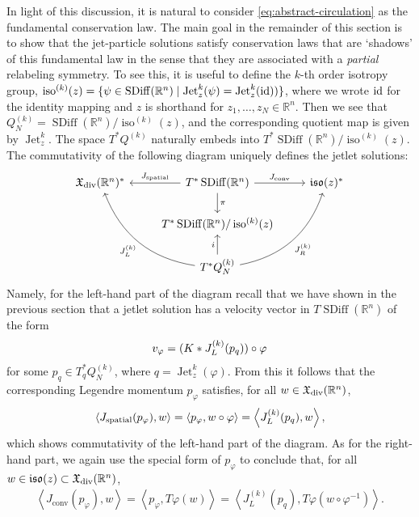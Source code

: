 \documentclass[12pt]{amsart}
\newcommand{\R}{\ensuremath{\mathbb{R}}}
\DeclareMathOperator{\SDiff}{SDiff}
\DeclareMathOperator{\Jet}{Jet}
\DeclareMathOperator{\iso}{iso}
\begin{document}
In light of this discussion, it is natural to consider \eqref{eq:abstract-circulation} as the  fundamental conservation law. The main goal in the remainder of this section is to show that the jet-particle solutions satisfy conservation laws that are `shadows' of this fundamental law in the sense that they are associated with a \emph{partial} relabeling symmetry. To see this, it is useful to define the $k$-th order isotropy group,
$\iso^{(k)}(z) = \{ \psi \in \SDiff(\R^n) \mid \Jet^{k}_z( \psi) = \Jet^k_z (\rm{id})) \}$, where we wrote $\rm{id}$ for the identity mapping and $z$ is shorthand for $z_1, \ldots, z_N \in \mathbb{R}^n$.
Then we see that $Q^{(k)}_N = \SDiff(\R^n) / \iso^{(k)}(z)$, and the corresponding quotient map is given by $\Jet_z^k$.  
 The space $T^*Q^{(k)}$ naturally embeds into $T^*\SDiff(\R^n) / \iso^{(k)}(z)$.  The commutativity of the following diagram uniquely defines the jetlet solutions:
  \begin{equation}
 \begin{tikzcd}
   \mathfrak{X}_{\rm div}(\R^n)^* & \ar[l,"J_\text{spatial}"'] T^*\SDiff(\R^n) \ar[r,"J_\text{conv}"] \ar[d,"\pi"] & \mathfrak{iso}(z)^* \\
   & T^*\SDiff(\R^n) / \iso^{(k)}(z) & \\
   & T^*Q^{(k)}_N \uar{i} \ar[uur,"J_R^{(k)}"',bend right = 30] \ar[uul,"J_L^{(k)}",bend left = 30] &
 \end{tikzcd}
\end{equation}
  Namely, for the left-hand part of the diagram recall that we have shown in the previous section that a jetlet solution has a velocity vector in $T \SDiff(\R^n)$ of the form \begin{align} v_{\varphi} = (K * J_L^{(k)}(p_q)) \circ \varphi \notag \end{align} for some $p_q \in T^*_q Q^{(k)}_N$, where $q = \Jet^k_z(\varphi)$. From this it follows that the corresponding Legendre momentum $p_\varphi$ satisfies, for all $ w \in \mathfrak{X}_{\rm div}(\R^n)$,
  \begin{align}
  \left< J_\text{spatial}(p_\varphi), w\right> = \left< p_\varphi, w \circ \varphi \right> = \left< J_L^{(k)}(p_q), w \right>, \notag
  \end{align}
  which shows commutativity of the left-hand part of the diagram. As for the right-hand part, we again use the special form of $p_\varphi$ to conclude that, for all $ w \in \mathfrak{iso}(z) \subset \mathfrak{X}_{\rm div}(\R^n)$,
 \begin{align}
 	\left<J_\text{conv}(p_\varphi), w\right> = \left<p_\varphi, T\varphi  (w) \right> = \left<J_L^{(k)}(p_q),  T\varphi (w \circ \varphi^{-1}) \right>. \label{compare_1}
 \end{align}
\end{document}
